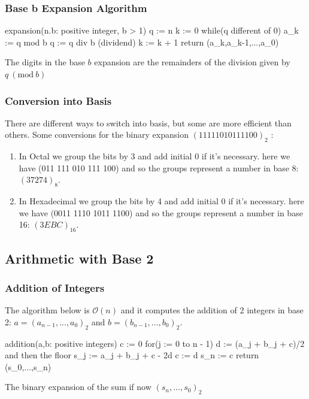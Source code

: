 \documentclass{article}
\newcommand{\Mod}[1]{\ (\mathrm{mod}\ #1)}
\begin{document}
\subsubsection{Base b Expansion Algorithm}
\begin{mylisting}
	expansion(n.b: positive integer, b > 1)
	q := n
	k := 0
	while(q different of 0)
		a_k := q mod b
		q := q div b (dividend)
		k := k + 1
	return (a_k,a_{k-1},...,a_0)
\end{mylisting}

\begin{tcolorbox}[width=12.1cm, leftrule=3mm]
The digits in the base $ b $ expansion are the remainders of the division given by $ q \Mod b $
\end{tcolorbox}

\subsubsection{Conversion into Basis} There are different ways to switch into basis, but some are more efficient than others. Some conversions for the binary expansion $ (11 1110 1011 1100)_2 $ :
\begin{enumerate}
\item In Octal we group the bits by 3 and add initial 0 if it's necessary. here we have (011 111 010 111 100) and so the groups represent a number in base 8: $ (37274)_8 $.
\item In Hexadecimal we group the bits by 4 and add initial 0 if it's necessary. here we have (0011 1110 1011 1100) and so the groups represent a number in base 16: $ (3EBC)_{16} $.
\end{enumerate}

\subsection{Arithmetic with Base 2}
\subsubsection{Addition of Integers} The algorithm below is $ \mathcal{O}(n) $ and it computes the addition of 2 integers in base 2: $ a = (a_{n-1},...,a_0)_2 $ and $ b = (b_{n-1},...,b_0)_2 $.
\begin{mylisting}
	addition(a,b: positive integers)
	c := 0
	for(j := 0 to n - 1)
		d := (a_j + b_j + c)/2 and then the floor
		s_j := a_j + b_j + c - 2d
		c := d
	s_n := c
	return (s_0,...,s_{n})	
\end{mylisting}
The binary expansion of the sum if now $ (s_n,...,s_0)_2 $
\end{document}
